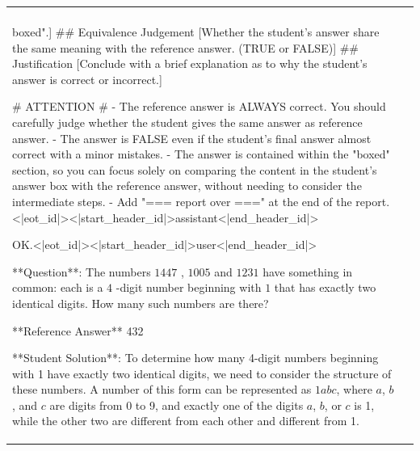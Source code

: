 \begin{table}
\centering
\tiny
\begin{tabular}{lp{12cm}}
\toprule

&
\begin{lstlisting}[
  basicstyle=\ttfamily\tiny,
  breaklines=true,
  breakatwhitespace=false,
  aboveskip=0pt,
  belowskip=0pt,
  lineskip=-1pt,
  xleftmargin=0pt,
  frame=none
  ]
system:
You are an experienced teacher in the field of MATHEMATICS.

user:
# OBJECTIVE #
You are tasked with evaluating the correctness of a student's answer. Below, you are provided with a problem, a reference answer, and a student's answer. You should assess whether the student's answer captures the same meaning as the reference answer, even when expressed with different wording or format.

Your tasks include:
A. Identify Mathematical or Notational Equivalence.
B. Conclude with a brief explanation as to why the student's output is correct or incorrect.

# RESPONSE: MARKDOWN REPORT #
## Student Final Answer
[Extract the student's final answer, which is enclosed in "\\boxed{}".]
## Equivalence Judgement
[Whether the student's answer share the same meaning with the reference answer. (TRUE or FALSE)]
## Justification
[Conclude with a brief explanation as to why the student's answer is correct or incorrect.]


# ATTENTION #
 - The reference answer is ALWAYS correct. You should carefully judge whether the student gives the same answer as reference answer.
 - The answer is FALSE even if the student's final answer almost correct with a minor mistakes.
 - The answer is contained within the "boxed" section, so you can focus solely on comparing the content in the student's answer box with the reference answer, without needing to consider the intermediate steps.
 - Add "=== report over ===" at the end of the report.<|eot_id|><|start_header_id|>assistant<|end_header_id|>

OK.<|eot_id|><|start_header_id|>user<|end_header_id|>

**Question**:
The numbers $1447$ , $1005$ and $1231$ have something in common: each is a $4$ -digit number beginning with $1$ that has exactly two identical digits. How many such numbers are there?

**Reference Answer**
432

**Student Solution**:
To determine how many 4-digit numbers beginning with 1 have exactly two identical digits, we need to consider the structure of these numbers. A number of this form can be represented as \(1abc\), where \(a\), \(b\), and \(c\) are digits from 0 to 9, and exactly one of the digits \(a\), \(b\), or \(c\) is 1, while the other two are different from each other and different from 1.


\end{lstlisting}
\end{tabular}
\end{table}
